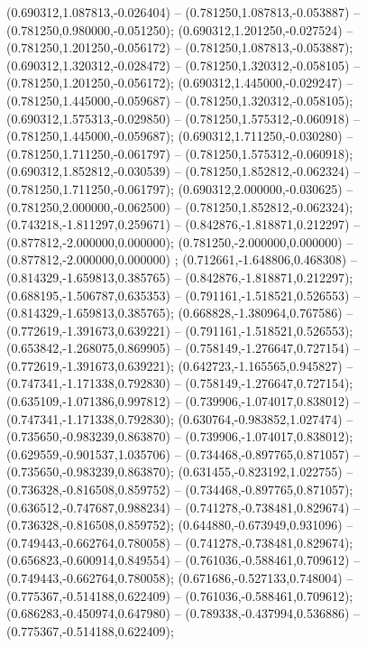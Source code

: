  (0.690312,1.087813,-0.026404) -- (0.781250,1.087813,-0.053887) -- (0.781250,0.980000,-0.051250);
 (0.690312,1.201250,-0.027524) -- (0.781250,1.201250,-0.056172) -- (0.781250,1.087813,-0.053887);
 (0.690312,1.320312,-0.028472) -- (0.781250,1.320312,-0.058105) -- (0.781250,1.201250,-0.056172);
 (0.690312,1.445000,-0.029247) -- (0.781250,1.445000,-0.059687) -- (0.781250,1.320312,-0.058105);
 (0.690312,1.575313,-0.029850) -- (0.781250,1.575312,-0.060918) -- (0.781250,1.445000,-0.059687);
 (0.690312,1.711250,-0.030280) -- (0.781250,1.711250,-0.061797) -- (0.781250,1.575312,-0.060918);
 (0.690312,1.852812,-0.030539) -- (0.781250,1.852812,-0.062324) -- (0.781250,1.711250,-0.061797);
 (0.690312,2.000000,-0.030625) -- (0.781250,2.000000,-0.062500) -- (0.781250,1.852812,-0.062324);
 (0.743218,-1.811297,0.259671) -- (0.842876,-1.818871,0.212297) -- (0.877812,-2.000000,0.000000);
 (0.781250,-2.000000,0.000000) -- (0.877812,-2.000000,0.000000) ;
 (0.712661,-1.648806,0.468308) -- (0.814329,-1.659813,0.385765) -- (0.842876,-1.818871,0.212297);
 (0.688195,-1.506787,0.635353) -- (0.791161,-1.518521,0.526553) -- (0.814329,-1.659813,0.385765);
 (0.668828,-1.380964,0.767586) -- (0.772619,-1.391673,0.639221) -- (0.791161,-1.518521,0.526553);
 (0.653842,-1.268075,0.869905) -- (0.758149,-1.276647,0.727154) -- (0.772619,-1.391673,0.639221);
 (0.642723,-1.165565,0.945827) -- (0.747341,-1.171338,0.792830) -- (0.758149,-1.276647,0.727154);
 (0.635109,-1.071386,0.997812) -- (0.739906,-1.074017,0.838012) -- (0.747341,-1.171338,0.792830);
 (0.630764,-0.983852,1.027474) -- (0.735650,-0.983239,0.863870) -- (0.739906,-1.074017,0.838012);
 (0.629559,-0.901537,1.035706) -- (0.734468,-0.897765,0.871057) -- (0.735650,-0.983239,0.863870);
 (0.631455,-0.823192,1.022755) -- (0.736328,-0.816508,0.859752) -- (0.734468,-0.897765,0.871057);
 (0.636512,-0.747687,0.988234) -- (0.741278,-0.738481,0.829674) -- (0.736328,-0.816508,0.859752);
 (0.644880,-0.673949,0.931096) -- (0.749443,-0.662764,0.780058) -- (0.741278,-0.738481,0.829674);
 (0.656823,-0.600914,0.849554) -- (0.761036,-0.588461,0.709612) -- (0.749443,-0.662764,0.780058);
 (0.671686,-0.527133,0.748004) -- (0.775367,-0.514188,0.622409) -- (0.761036,-0.588461,0.709612);
 (0.686283,-0.450974,0.647980) -- (0.789338,-0.437994,0.536886) -- (0.775367,-0.514188,0.622409);
